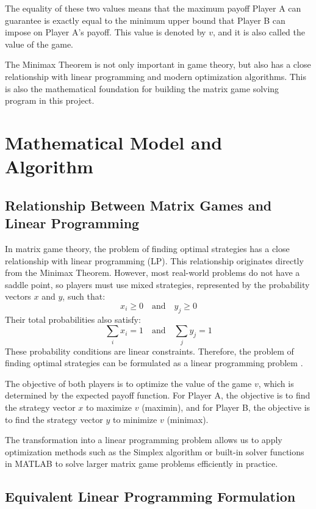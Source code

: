 \documentclass[12pt,a4paper]{article}
\begin{document}
The equality of these two values means that the maximum payoff Player A can guarantee is exactly equal to the minimum upper bound that Player B can impose on Player A's payoff. This value is denoted by \(v\), and it is also called the value of the game.

The Minimax Theorem is not only important in game theory, but also has a close relationship with linear programming and modern optimization algorithms. This is also the mathematical foundation for building the matrix game solving program in this project.



\section{Mathematical Model and Algorithm}
\subsection{Relationship Between Matrix Games and Linear Programming}
In matrix game theory, the problem of finding optimal strategies has a close relationship with linear programming (LP). This relationship originates directly from the Minimax Theorem. However, most real-world problems do not have a saddle point, so players must use mixed strategies, represented by the probability vectors \(x\) and \(y\), such that:
\[
x_i \ge 0 \quad \text{and} \quad y_j \ge 0
\]
Their total probabilities also satisfy:
\[
\sum_i x_i = 1 \quad \text{and} \quad \sum_j y_j = 1
\]
These probability conditions are linear constraints. Therefore, the problem of finding optimal strategies can be formulated as a linear programming problem \cite{thie2008}.

The objective of both players is to optimize the value of the game \(v\), which is determined by the expected payoff function. For Player A, the objective is to find the strategy vector \(x\) to maximize \(v\) (maximin), and for Player B, the objective is to find the strategy vector \(y\) to minimize \(v\) (minimax).

The transformation into a linear programming problem allows us to apply optimization methods such as the Simplex algorithm or built-in solver functions in MATLAB to solve larger matrix game problems efficiently in practice.

\subsection{Equivalent Linear Programming Formulation}
\end{document}
